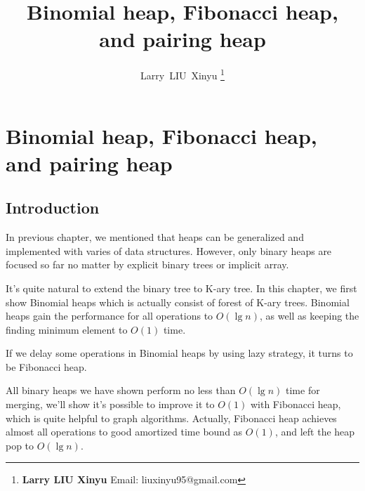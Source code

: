 \documentclass{article}
\begin{document}


\title{Binomial heap, Fibonacci heap, and pairing heap}

\author{Larry~LIU~Xinyu
\thanks{{\bfseries Larry LIU Xinyu } \newline
  Email: liuxinyu95@gmail.com \newline}
  }

\maketitle
\fi


\ifx\wholebook\relax
\chapter{Binomial heap, Fibonacci heap, and pairing heap}
\fi

\section{Introduction}
\label{introduction}
In previous chapter, we mentioned that heaps can be
generalized and implemented with varies of data structures. However,
only binary heaps are focused so far no matter by explicit binary
trees or implicit array.

It's quite natural to extend the binary tree to K-ary \cite{K-ary-tree} tree.
In this chapter, we first show Binomial heaps
which is actually consist of forest of K-ary trees. Binomial heaps gain the
performance for all operations to $O(\lg n)$, as well as keeping the finding
minimum element to $O(1)$ time.

If we delay some operations in Binomial
heaps by using lazy strategy, it turns to be Fibonacci heap.

All binary heaps we have shown perform
no less than $O(\lg n)$ time for merging, we'll show it's possible to
improve it to $O(1)$ with Fibonacci heap, which is quite helpful to
graph algorithms. Actually, Fibonacci heap achieves almost all operations
to good amortized time bound as $O(1)$,
and left the heap pop to $O(\lg n)$.
\end{document}
